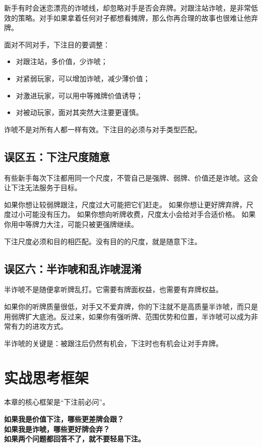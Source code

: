 新手有时会迷恋漂亮的诈唬线，却忽略对手是否会弃牌。对跟注站诈唬，是非常低效的策略。对手如果拿着任何对子都想看摊牌，那么你再合理的故事也很难让他弃牌。

面对不同对手，下注目的要调整：

\begin{itemize}
\item 对跟注站，多价值，少诈唬；
\item 对紧弱玩家，可以增加诈唬，减少薄价值；
\item 对激进玩家，可以用中等摊牌价值诱导；
\item 对被动玩家，面对其突然大注要更谨慎。
\end{itemize}

诈唬不是对所有人都一样有效。下注目的必须与对手类型匹配。

\subsection{误区五：下注尺度随意}

有些新手每次下注都用同一个尺度，不管自己是强牌、弱牌、价值还是诈唬。这会让下注无法服务于目标。

如果你想让较弱牌跟注，尺度过大可能把它们赶走。
如果你想让更好牌弃牌，尺度过小可能没有压力。
如果你想向听牌收费，尺度太小会给对手合适价格。
如果你用中等牌力大注，可能只被更强牌继续。

下注尺度必须和目的相匹配。没有目的的尺度，就是随意下注。

\subsection{误区六：半诈唬和乱诈唬混淆}

半诈唬不是随便拿听牌乱打。它需要有牌面权益，也需要有弃牌权益。

如果你的听牌质量很低，对手又不爱弃牌，你的下注就不是高质量半诈唬，而只是用弱牌扩大底池。反过来，如果你有强听牌、范围优势和位置，半诈唬可以成为非常有力的进攻方式。

半诈唬的关键是：被跟注后仍然有机会，下注时也有机会让对手弃牌。

\section{实战思考框架}

本章的核心框架是“下注前必问”。

\begin{center}
\textbf{如果我是价值下注，哪些更差牌会跟？\\
如果我是诈唬，哪些更好牌会弃？\\
如果两个问题都回答不了，就不要轻易下注。}
\end{center}

